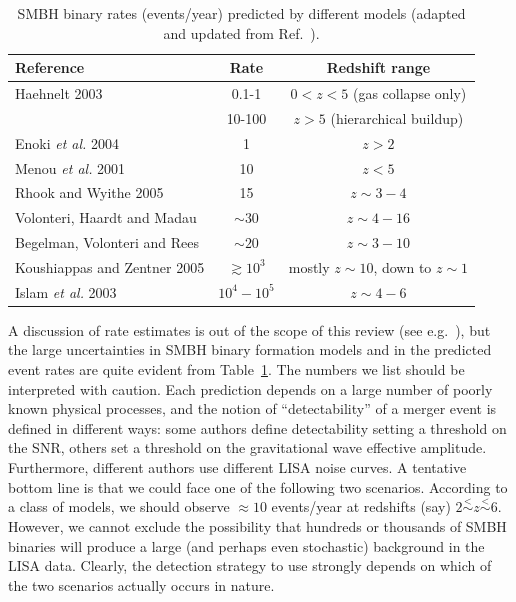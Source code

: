 \documentclass[]{iopart}
\def\lappreq{\! \stackrel{\scriptscriptstyle <}{\scriptscriptstyle
\sim}\!}
\begin{document}
\begin{table}[hbt]
\centering
\caption{SMBH binary rates (events/year) predicted by different models
  (adapted and updated from Ref.~\cite{Berti:2006ew}).}
\vskip 12pt
%
\begin{tabular}{@{}lcc@{}}
\hline
\hline
Reference                                       & Rate             & Redshift range\\
\hline
\hline
Haehnelt 2003 \cite{Haehnelt:2004}                  & 0.1-1            & $0<z<5$ (gas collapse only) \\
                                                & 10-100           & $z>5$ (hierarchical buildup) \\
\hline
Enoki {\it et al.} 2004 \cite{Enoki:2004ew}             & 1                & $z>2$\\
\hline
Menou {\it et al.} 2001 \cite{Menou:2001hb}     & 10               & $z<5$ \\
\hline
Rhook and Wyithe 2005 \cite{Rhook:2005pt,Wyithe:2002ep}   & 15               & $z\sim 3-4$\\
\hline
Volonteri, Haardt and Madau \cite{Volonteri:2002vz,Sesana:2007sh,Arun:2008zn} & $\sim 30$ & $z\sim 4-16$\\
\hline
Begelman, Volonteri and Rees \cite{Begelman:2006db,Sesana:2007sh,Arun:2008zn} & $\sim 20$ & $z\sim 3-10$\\

\hline
Koushiappas and Zentner 2005 \cite{Koushiappas:2005qz}          & $\gtrsim 10^3$ & mostly $z\sim 10$, down to $z\sim 1$\\
\hline
Islam {\it et al.} 2003 \cite{Islam:2003nt}              & $10^4-10^5$      & $z\sim 4-6$\\
\hline	     	   	       	            	 	     
\hline								     
\end{tabular}
\label{tab:rates}
\end{table}

A discussion of rate estimates is out of the scope of this review (see
e.g.~\cite{Berti:2006ew,Arun:2008zn,Tanaka:2008bv}), but the large
uncertainties in SMBH binary formation models and in the predicted event rates
are quite evident from Table~\ref{tab:rates}. The numbers we list should be
interpreted with caution. Each prediction depends on a large number of poorly
known physical processes, and the notion of ``detectability'' of a merger
event is defined in different ways: some authors define detectability setting
a threshold on the SNR, others set a threshold on the gravitational wave
effective amplitude. Furthermore, different authors use different LISA noise
curves.
%
A tentative bottom line is that we could face one of the following two
scenarios. According to a class of models, we should observe $\approx 10$
events/year at redshifts (say) $2\lappreq z\lappreq 6$. However, we cannot
exclude the possibility that hundreds or thousands of SMBH binaries will
produce a large (and perhaps even stochastic) background in the LISA
data. Clearly, the detection strategy to use strongly depends on which of the
two scenarios actually occurs in nature.
\end{document}
